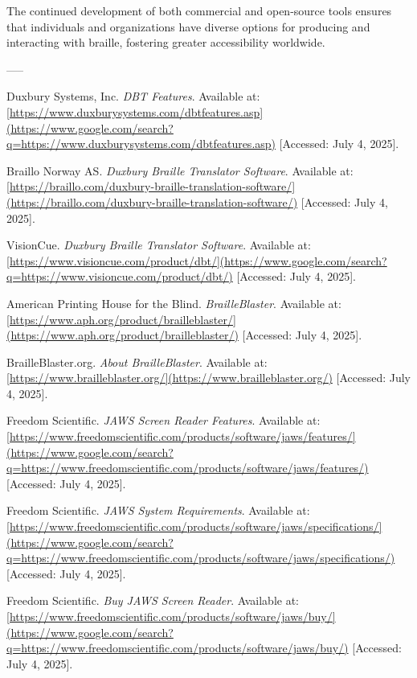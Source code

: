 The continued development of both commercial and open-source tools ensures that individuals and organizations have diverse options for producing and interacting with braille, fostering greater accessibility worldwide.

-----

\begin{thebibliography}{99}

 Duxbury Systems, Inc. \textit{DBT Features}. Available at: \url{[https://www.duxburysystems.com/dbtfeatures.asp](https://www.google.com/search?q=https://www.duxburysystems.com/dbtfeatures.asp)} [Accessed: July 4, 2025].

 Braillo Norway AS. \textit{Duxbury Braille Translator Software}. Available at: \url{[https://braillo.com/duxbury-braille-translation-software/](https://braillo.com/duxbury-braille-translation-software/)} [Accessed: July 4, 2025].

 VisionCue. \textit{Duxbury Braille Translator Software}. Available at: \url{[https://www.visioncue.com/product/dbt/](https://www.google.com/search?q=https://www.visioncue.com/product/dbt/)} [Accessed: July 4, 2025].

 American Printing House for the Blind. \textit{BrailleBlaster}. Available at: \url{[https://www.aph.org/product/brailleblaster/](https://www.aph.org/product/brailleblaster/)} [Accessed: July 4, 2025].

 BrailleBlaster.org. \textit{About BrailleBlaster}. Available at: \url{[https://www.brailleblaster.org/](https://www.brailleblaster.org/)} [Accessed: July 4, 2025].

 Freedom Scientific. \textit{JAWS Screen Reader Features}. Available at: \url{[https://www.freedomscientific.com/products/software/jaws/features/](https://www.google.com/search?q=https://www.freedomscientific.com/products/software/jaws/features/)} [Accessed: July 4, 2025].

 Freedom Scientific. \textit{JAWS System Requirements}. Available at: \url{[https://www.freedomscientific.com/products/software/jaws/specifications/](https://www.google.com/search?q=https://www.freedomscientific.com/products/software/jaws/specifications/)} [Accessed: July 4, 2025].

 Freedom Scientific. \textit{Buy JAWS Screen Reader}. Available at: \url{[https://www.freedomscientific.com/products/software/jaws/buy/](https://www.google.com/search?q=https://www.freedomscientific.com/products/software/jaws/buy/)} [Accessed: July 4, 2025].


\end{thebibliography}
